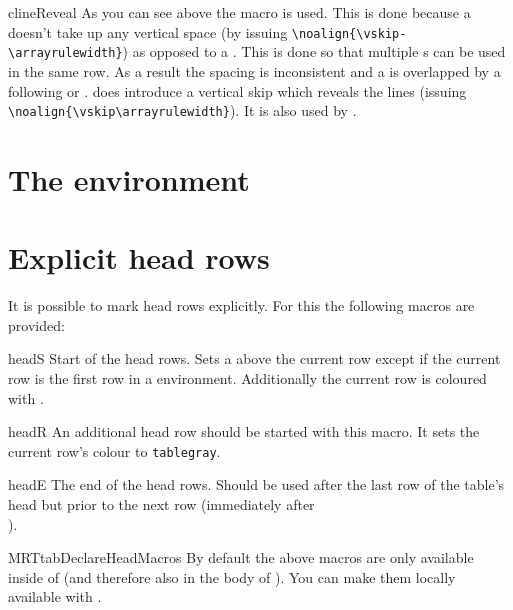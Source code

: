 \begin{describemacro}{clineReveal}
  As you can see above the macro  is used. This is done because
  a  doesn't take up any vertical space (by issuing
  \verb|\noalign{\vskip-\arrayrulewidth}|) as opposed to a . This is
  done so that multiple s can be used in the same row. As a result the
  spacing is inconsistent and a  is overlapped by a following
   or .  does introduce a vertical
  skip which reveals the lines (issuing \verb|\noalign{\vskip\arrayrulewidth}|).
  It is also used by .
\end{describemacro}

\section{The  environment}\label{sec:tab:table}%

\section{Explicit head rows}\label{sec:tab:explicit}%
It is possible to mark head rows explicitly. For this the following macros are
provided:

\begin{describemacro}{headS}%
  Start of the head rows. Sets a  above the current row except if the
  current row is the first row in a  environment. Additionally
  the current row is coloured with .
\end{describemacro}%

\begin{describemacro}{headR}%
  An additional head row should be started with this macro. It sets the current
  row's colour to \texttt{tablegray}.
\end{describemacro}%

\begin{describemacro}{headE}%
  The end of the head rows. Should be used after the last row of the table's
  head but prior to the next row (immediately after \texttt{\string\\}).
\end{describemacro}%

\begin{describemacro}{MRTtabDeclareHeadMacros}%
  By default the above macros are only available inside of  (and
  therefore also in the body of ). You can make them locally
  available with .
\end{describemacro}%

